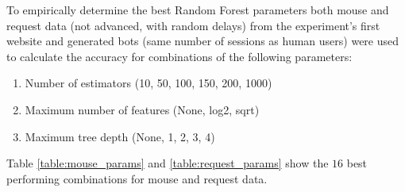 \documentclass[
    fontsize=12pt,
    headings=small,
    parskip=half,           %
    bibliography=totoc,
    numbers=noenddot,       %
    open=any,               %
    final                   %
]{scrreprt}
\renewcommand{\arraystretch}{1.5}
\begin{document}
To empirically determine the best Random Forest parameters both mouse and request data (not advanced, with random delays) from the experiment's first website and generated bots (same number of sessions as human users) were used to calculate the accuracy for combinations of the following parameters:

\begin{enumerate}
	\item Number of estimators (10, 50, 100, 150, 200, 1000)
	\item Maximum number of features (None, log2, sqrt)
	\item Maximum tree depth (None, 1, 2, 3, 4)
\end{enumerate}

Table \ref{table:mouse_params} and \ref{table:request_params} show the $16$ best performing combinations for mouse  and request data.

\setlength{\arrayrulewidth}{0.2mm}
\setlength{\tabcolsep}{18pt}
\renewcommand{\arraystretch}{0.9}
\end{document}
